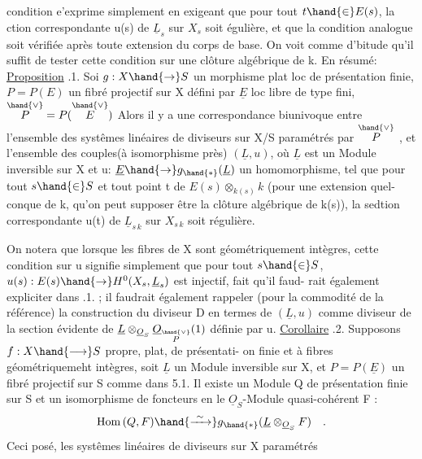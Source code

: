 
condition e'exprime simplement en exigeant que pour tout $t\hand{\in} E(s)$,
la ction correspondante u(s) de $\underline{L}_s$ sur $X_s$ soit égulière, et que la
condition analogue soit vérifiée après toute extension du corps de base.
On voit comme d'bitude qu'il suffit de tester cette condition sur une
clôture algébrique de k. En résumé:
\uline{Proposition} .1. Soi $g:X\hand{\to} S$ un morphisme plat loc de présentation
finie, $P=P(E)$ un fibré projectif sur X défini par $\underline{E}$ loc libre de type
fini, $\overset{\hand{\vee}}{P} = P(\overset{\hand{\vee}}{E})$ \hand{,} Alors il y a une correspondance biunivoque entre
l'ensemble des systêmes linéaires de diviseurs sur X/S paramétrés par $\overset{\hand{\vee}}{P}$ ,
et l'ensemble des couples(à isomorphisme près) $(\underline{L},u)$, où $\underline{L}$ est un
Module inversible sur X et u: $\underline{E}\hand{\to} g_{\hand{*}}(\underline{L})$ un homomorphisme, tel que
pour tout $s\hand{\in} S$ et tout point t de $E(s)\otimes_{k(s)}k$ (pour une extension quel-%
\margin{$\cdot$} conque de k, qu'on peut supposer être la clôture algébrique de k(s)),
la sedtion correspondante u(t) de $\underline{L}_{s\,k}$ sur $X_{s\,k}$ soit régulière.

On notera que lorsque les fibres de X sont 
géométriquement intègres, cette condition sur u signifie simplement que
pour tout $s\hand{\in} S$, $u(s): E(s)\hand{\rightarrow} H^{0}(X_s,\underline{L}_s)$ est injectif, fait qu'il faud-%
rait également expliciter dans .1. ;  il faudrait également rappeler
(pour la commodité de la référence) la construction du diviseur D en
termes de $(\underline{L},u)$ comme diviseur de la section évidente \inserted{$\phi$} de $\underline{L}\otimes_{\underline{O}_S}\underline{O}_{\overset{\hand{\vee}}{P}}(1)$
définie par u.
\uline{Corollaire} .2.  Supposons $f: X\hand{\longrightarrow} S$ propre, plat, de présentati-%
on finie et à fibres géométriquemeht intègres,  soit $\underline{L}$ un Module
inversible sur X, et $P=P(\underline{E})$ un fibré projectif sur S comme dans 5.1.
 Il existe un Module Q de présentation finie sur S et un
isomorphisme de foncteurs en le $\underline{O}_S$-Module quasi-cohérent F :
\[ \mathrm{Hom}\,(Q,F) \hand{\xrightarrow{\ \sim\ }} g_{\hand{*}}(\underline{L}\otimes_{\underline{O}_S}F) \quad . \]
Ceci posé, les  systêmes linéaires de diviseurs sur X paramétrés

